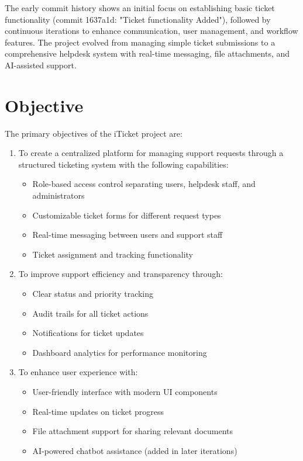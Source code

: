 \documentclass[12pt,a4paper]{article}
\begin{document}
The early commit history shows an initial focus on establishing basic ticket functionality (commit 1637a1d: "Ticket functionality Added"), followed by continuous iterations to enhance communication, user management, and workflow features. The project evolved from managing simple ticket submissions to a comprehensive helpdesk system with real-time messaging, file attachments, and AI-assisted support.

\section{Objective}

The primary objectives of the iTicket project are:

\begin{enumerate}
    \item To create a centralized platform for managing support requests through a structured ticketing system with the following capabilities:
    \begin{itemize}
        \item Role-based access control separating users, helpdesk staff, and administrators
        \item Customizable ticket forms for different request types
        \item Real-time messaging between users and support staff
        \item Ticket assignment and tracking functionality
    \end{itemize}
    
    \item To improve support efficiency and transparency through:
    \begin{itemize}
        \item Clear status and priority tracking
        \item Audit trails for all ticket actions
        \item Notifications for ticket updates
        \item Dashboard analytics for performance monitoring
    \end{itemize}
    
    \item To enhance user experience with:
    \begin{itemize}
        \item User-friendly interface with modern UI components
        \item Real-time updates on ticket progress
        \item File attachment support for sharing relevant documents
        \item AI-powered chatbot assistance (added in later iterations)
    \end{itemize}
\end{enumerate}
\end{document}
